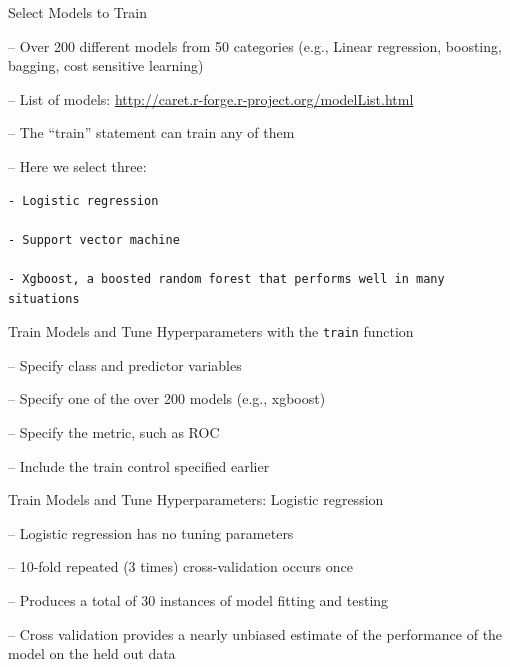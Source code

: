 \documentclass[ignorenonframetext,]{beamer}
\begin{document}
\begin{frame}[fragile]{Select Models to Train}

-- Over 200 different models from 50 categories (e.g., Linear
regression, boosting, bagging, cost sensitive learning)

-- List of models:
\url{http://caret.r-forge.r-project.org/modelList.html}

-- The ``train'' statement can train any of them

-- Here we select three:

\begin{verbatim}
- Logistic regression

- Support vector machine

- Xgboost, a boosted random forest that performs well in many situations
\end{verbatim}

\end{frame}

\begin{frame}{Train Models and Tune Hyperparameters with the
\texttt{train} function}

-- Specify class and predictor variables

-- Specify one of the over 200 models (e.g., xgboost)

-- Specify the metric, such as ROC

-- Include the train control specified earlier

\end{frame}

\begin{frame}{Train Models and Tune Hyperparameters: Logistic
regression}

-- Logistic regression has no tuning parameters

-- 10-fold repeated (3 times) cross-validation occurs once

-- Produces a total of 30 instances of model fitting and testing

-- Cross validation provides a nearly unbiased estimate of the
performance of the model on the held out data

\end{frame}
\end{document}

